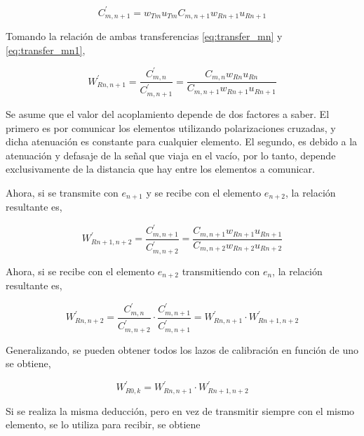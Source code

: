 \begin{equation}
	C^{'}_{m,n + 1} = w_{Tm} u_{Tm} C_{m,n + 1} w_{Rn + 1} u_{Rn + 1}
	\label{eq:transfer_mn1}
\end{equation}

Tomando la relación de ambas transferencias \ref{eq:transfer_mn} y \ref{eq:transfer_mn1},

\begin{equation}
	W^{'}_{Rn,n + 1} = \dfrac{C^{'}_{m,n}}{C^{'}_{m,n + 1}} = \dfrac{C_{m,n} w_{Rn} u_{Rn}}{C_{m,n + 1} w_{Rn + 1} u_{Rn + 1}}
\end{equation}

Se asume que el valor del acoplamiento depende de dos factores a saber. El primero es por comunicar los elementos utilizando
polarizaciones cruzadas, y dicha atenuación es constante para cualquier elemento. El segundo, es debido a la atenuación y 
defasaje de la señal que viaja en el vacío, por lo tanto, depende exclusivamente de la distancia que hay entre los elementos
a comunicar.

Ahora, si se transmite con $e_{n+1}$ y se recibe con el elemento $e_{n+2}$, la relación resultante es,

\begin{equation}
	W^{'}_{Rn + 1,n + 2} = \dfrac{C^{'}_{m,n+1}}{C^{'}_{m,n+2}} = \dfrac{C_{m,n+1} w_{Rn+1} u_{Rn+1}}{C_{m,n + 2} w_{Rn + 2} u_{Rn + 2}}
\end{equation}

Ahora, si se recibe con el elemento $e_{n+2}$ transmitiendo con $e_n$, la relación resultante es,

\begin{equation}
	W^{'}_{Rn,n + 2} = \dfrac{C^{'}_{m,n}}{C^{'}_{m,n + 2}}\cdot\dfrac{C^{'}_{m,n+1}}{C^{'}_{m,n+1}} = W^{'}_{Rn,n+1}\cdot W^{'}_{Rn+1,n + 2}
\end{equation}

Generalizando, se pueden obtener todos los lazos de calibración en función de uno se obtiene,

\begin{equation}
	W^{'}_{R0,k} = W^{'}_{Rn,n+1}\cdot W^{'}_{Rn+1,n + 2}
	\label{eq:rx_cal}
\end{equation}

Si se realiza la misma deducción, pero en vez de transmitir siempre con el mismo elemento, se lo utiliza para recibir, se obtiene 

